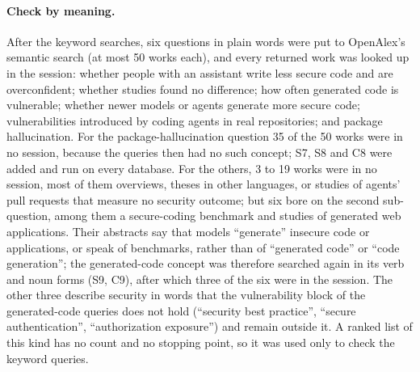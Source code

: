 \paragraph{Check by meaning.}
After the keyword searches, six questions in plain words were put to
OpenAlex's semantic search (at most 50 works each), and every returned work
was looked up in the session: whether people with an assistant write less
secure code and are overconfident; whether studies found no difference; how
often generated code is vulnerable; whether newer models or agents generate
more secure code; vulnerabilities introduced by coding agents in real
repositories; and package hallucination.
For the package-hallucination question 35 of the 50 works were in no
session, because the queries then had no such concept; S7, S8 and C8 were
added and run on every database.
For the others, 3 to 19 works were in no session, most of them overviews,
theses in other languages, or studies of agents' pull requests that measure
no security outcome; but six bore on the second sub-question, among them a
secure-coding benchmark \autocite{Bhatt2023CyberSecEval} and studies of
generated web applications.
Their abstracts say that models \enquote{generate} insecure code or
applications, or speak of benchmarks, rather than of \enquote{generated
code} or \enquote{code generation}; the generated-code concept was
therefore searched again in its verb and noun forms (S9, C9), after which
three of the six were in the session.
The other three describe security in words that the vulnerability block
of the generated-code queries does not hold (\enquote{security best
practice}, \enquote{secure authentication}, \enquote{authorization
exposure}) and remain outside it.
A ranked list of this kind has no count and no stopping point, so it was
used only to check the keyword queries.

